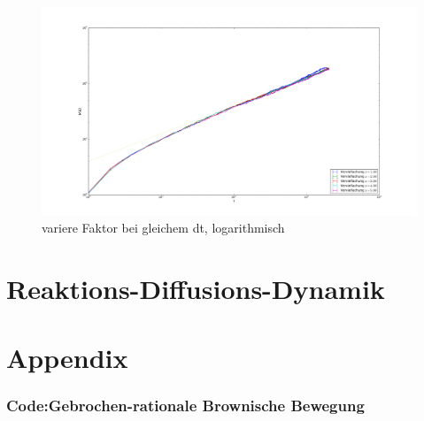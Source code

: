 \documentclass[
  a4paper,BCOR10mm,oneside,
  bibtotoc,idxtotoc,
  headsepline,footsepline,%
  fleqn,openbib
]{scrbook}
\begin{document}
\begin{figure}[h]
\includegraphics[width=\textwidth]{./faktor_variert_bei_dt_1_log.pdf}
\caption{variere Faktor bei gleichem dt, logarithmisch}
 \centering
\end{figure}

\chapter{Reaktions-Diffusions-Dynamik}
\chapter{Appendix}
\subsection{Code:Gebrochen-rationale Brownische Bewegung}


\nocite{}



\end{document}

